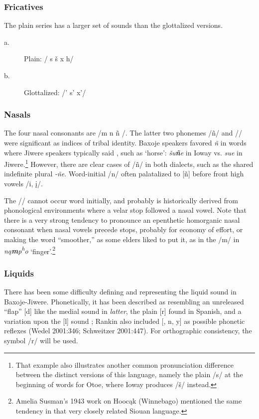 \documentclass[output=paper]{LSP/langsci}
\begin{document}
\subsubsection{Fricatives}  The plain series has a larger set of sounds than the glottalized versions.  				
\begin{description}
\item[a.] Plain: 	  /  s  \v{s}  x   h/   								        	
\item[b.] Glottalized:  /'     s'    x'/	
\end{description}
 						    
\subsubsection{Nasals}  The four nasal consonants are /m n \~n /.  The latter two phonemes /\~n/ and // were significant as indices of tribal identity.  Baxoje speakers favored \textit{\~n} in words where Jiwere speakers typically said \textit{}, such as `horse': \textit{\v{s}u\textbf{\~n}e} in Ioway vs. \textit{su\textbf{}e} in Jiwere.\footnote{That example also illustrates another common pronunciation difference between the distinct versions of this language, namely the plain /s/ at the beginning of words for Otoe, where Ioway produces /\v{s}/ instead.}   However, there are clear cases of  /\~n/ in both dialects, such as the shared indefinite plural \textit{-\~ne}.  Word-initial /n/ often palatalized to [\~n] before front high vowels /i, \k{i}/.  

The // cannot occur word initially, and probably is historically derived from phonological environments where a velar stop followed a nasal vowel.  Note that there is a very strong tendency to pronounce an  epenthetic homorganic nasal consonant when nasal vowels precede stops, probably for economy of effort, or making the word ``smoother,'' as some elders liked to put it, as in the /m/ in \textit{n\k{a}\textbf{m}p\textsuperscript{h}o} `finger'.\footnote{Amelia Susman's 1943 work on Hooc\k{a}k (Winnebago) mentioned the same tendency in that very closely related Siouan language.}

\subsubsection{Liquids}  There has been some difficulty defining and representing the liquid sound in Baxoje-Jiwere.  Phonetically, it has been described as resembling an unreleased ``flap'' [d] like the medial sound in \textit{latter}, the plain [r] found in Spanish, and a variation upon the [l] sound \citep[235]{Whitman1947};  Rankin also included [, n, y] as possible phonetic reflexes (Wedel 2001:346; Schweitzer 2001:447). For orthographic consistency, the symbol /r/ will be used. 
\end{document}
